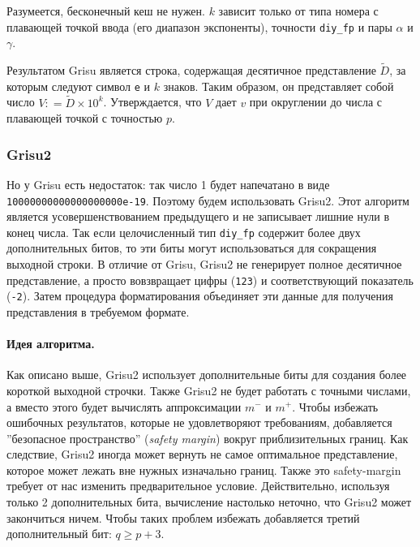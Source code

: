 \documentclass[a4paper, 12pt, twoside]{article}
\begin{document}
Разумеется, бесконечный кеш не нужен. 
$k$ зависит только от типа номера с плавающей точкой ввода (его диапазон экспоненты), точности \texttt{diy\_fp} и пары $\alpha$ и $\gamma$.

Результатом \textsf{Grisu} является строка, содержащая десятичное представление $\tilde{D}$, за которым следуют символ \texttt{e} и $k$ знаков. 
Таким образом, он представляет собой число $V: = \tilde{D} \times 10^k$. 
Утверждается, что $V$ дает $v$ при округлении до числа с плавающей точкой с точностью $p$.

\subsubsection{\textsf{Grisu2}}
Но у \textsf{Grisu} есть недостаток: так число 1 будет напечатано в виде \\ \texttt{10000000000000000000e-19}.
Поэтому будем использовать \textsf{Grisu2}.
Этот алгоритм является усовершенствованием предыдущего и не записывает лишние нули в конец числа.
Так если целочисленный тип \texttt{diy\_fp} содержит более двух дополнительных битов, то эти биты могут использоваться для сокращения выходной строки.
В отличие от \textsf{Grisu}, \textsf{Grisu2} не генерирует полное десятичное представление, а просто вовзвращает цифры (\texttt{123}) и соответствующий показатель (\texttt{-2}). 
Затем процедура форматирования объединяет эти данные для получения представления в требуемом формате.

\paragraph{Идея алгоритма.} 
Как описано выше, \textsf{Grisu2} использует дополнительные биты для создания более короткой выходной строчки. 
Также \textsf{Grisu2} не будет работать с точными числами, а вместо этого будет вычислять аппроксимации $m^{-}$ и $m^+$. 
Чтобы избежать ошибочных результатов, которые не удовлетворяют требованиям, добавляется ''безопасное пространство'' (\textit{safety margin}) вокруг приблизительных границ. 
Как следствие, \textsf{Grisu2} иногда может вернуть не самое оптимальное представление, которое может лежать вне нужных изначально границ. 
Также это safety-margin требует от нас изменить предварительное условие. 
Действительно, используя только 2 дополнительных бита, вычисление настолько неточно, что \textsf{Grisu2} может закончиться ничем.
Чтобы таких проблем избежать добавляется третий дополнительный бит: $q \geqslant p + 3$.
\end{document}
